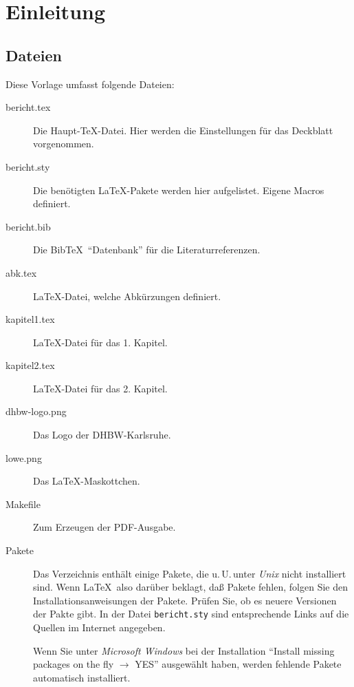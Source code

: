 
\chapter{Einleitung}

\section{Dateien}
Diese Vorlage umfasst folgende Dateien:
\begin{description}
\item[bericht.tex] Die Haupt-\TeX-Datei. Hier werden die Einstellungen für das
     Deckblatt vorgenommen.
\item[bericht.sty] Die benötigten \LaTeX-Pakete werden hier aufgelistet. Eigene Macros definiert.
\item[bericht.bib] Die Bib\TeX\ "`Datenbank"' für die Literaturreferenzen.
\item[abk.tex] \LaTeX-Datei, welche Abkürzungen definiert.
\item[kapitel1.tex] \LaTeX-Datei für das 1. Kapitel.
\item[kapitel2.tex] \LaTeX-Datei für das 2. Kapitel.
\item[dhbw-logo.png] Das Logo der DHBW-Karlsruhe.
\item[lowe.png] Das \LaTeX-Maskottchen.
\item[Makefile] Zum Erzeugen der PDF-Ausgabe.
\item[Pakete] Das Verzeichnis enthält einige Pakete, die u.\,U.\,unter \emph{Unix} nicht installiert
     sind. Wenn \LaTeX\ also darüber beklagt, daß Pakete fehlen, folgen Sie den Installationsanweisungen
     der Pakete. Prüfen Sie, ob es neuere Versionen der Pakte gibt. In der Datei
     \texttt{bericht.sty} sind entsprechende Links auf die Quellen im Internet angegeben.

     Wenn Sie unter \emph{Microsoft Windows} bei der Installation
     \enquote{Install missing packages on the fly $\longrightarrow$ YES} ausgewählt haben,
     werden fehlende Pakete automatisch installiert.
\end{description}

